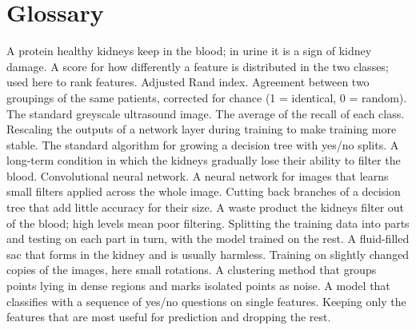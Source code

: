 \clearpage
{}
\section*{Glossary}
{\footnotesize{}
\begin{description}[style=sameline, leftmargin=3.6cm, labelwidth=3.4cm, labelsep=0.2cm, itemsep=1pt, parsep=0pt, topsep=2pt, font=\normalfont\bfseries]
     A protein healthy kidneys keep in the blood; in urine it is a sign of kidney damage.
     A score for how differently a feature is distributed in the two classes; used here to rank features.
     Adjusted Rand index. Agreement between two groupings of the same patients, corrected for chance (1 = identical, 0 = random).
     The standard greyscale ultrasound image.
     The average of the recall of each class.
     Rescaling the outputs of a network layer during training to make training more stable.
     The standard algorithm for growing a decision tree with yes/no splits.
     A long-term condition in which the kidneys gradually lose their ability to filter the blood.
     Convolutional neural network. A neural network for images that learns small filters applied across the whole image.
     Cutting back branches of a decision tree that add little accuracy for their size.
     A waste product the kidneys filter out of the blood; high levels mean poor filtering.
     Splitting the training data into parts and testing on each part in turn, with the model trained on the rest.
     A fluid-filled sac that forms in the kidney and is usually harmless.
     Training on slightly changed copies of the images, here small rotations.
     A clustering method that groups points lying in dense regions and marks isolated points as noise.
     A model that classifies with a sequence of yes/no questions on single features.
     Keeping only the features that are most useful for prediction and dropping the rest.

\end{description}}
